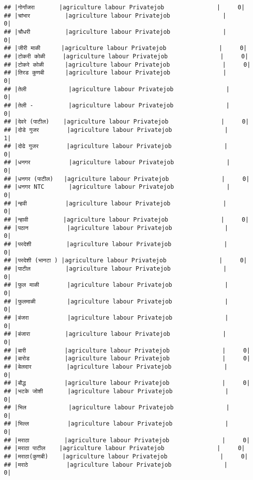 \documentclass[
]{article}
\begin{document}
\begin{verbatim}
## |गोर्गांजरा       |agriculture labour Privatejob               |     0|
## |चांभार          |agriculture labour Privatejob               |     0|
## |चौधरी          |agriculture labour Privatejob               |     0|
## |जीरी माळी      |agriculture labour Privatejob               |     0|
## |टोकरी कोळी     |agriculture labour Privatejob               |     0|
## |टोकरे कोळी      |agriculture labour Privatejob               |     0|
## |तिरड कुणबी      |agriculture labour Privatejob               |     0|
## |तेली            |agriculture labour Privatejob               |     0|
## |तेली -          |agriculture labour Privatejob               |     0|
## |देवरे (पाटील)    |agriculture labour Privatejob               |     0|
## |दोडे गुजर        |agriculture labour Privatejob               |     1|
## |दोढे गुजर        |agriculture labour Privatejob               |     0|
## |धनगर           |agriculture labour Privatejob               |     0|
## |धनगर (पाटील)   |agriculture labour Privatejob               |     0|
## |धनगर NTC       |agriculture labour Privatejob               |     0|
## |न्हवी           |agriculture labour Privatejob               |     0|
## |न्हावी          |agriculture labour Privatejob               |     0|
## |पठान           |agriculture labour Privatejob               |     0|
## |परदेशी          |agriculture labour Privatejob               |     0|
## |परदेशी (भानटा ) |agriculture labour Privatejob               |     0|
## |पाटील          |agriculture labour Privatejob               |     0|
## |फुल माळी        |agriculture labour Privatejob               |     0|
## |फुलमाळी         |agriculture labour Privatejob               |     0|
## |बंजरा           |agriculture labour Privatejob               |     0|
## |बंजारा          |agriculture labour Privatejob               |     0|
## |बारी           |agriculture labour Privatejob               |     0|
## |बारोड          |agriculture labour Privatejob               |     0|
## |बेलदार          |agriculture labour Privatejob               |     0|
## |बौद्ध           |agriculture labour Privatejob               |     0|
## |भटके जोशी       |agriculture labour Privatejob               |     0|
## |भिल            |agriculture labour Privatejob               |     0|
## |भिल्ल           |agriculture labour Privatejob               |     0|
## |मराठा          |agriculture labour Privatejob               |     0|
## |मराठा पाटील    |agriculture labour Privatejob               |     0|
## |मराठा(कुणबी)    |agriculture labour Privatejob               |     0|
## |मराठे           |agriculture labour Privatejob               |     0|

\end{verbatim}
\end{document}
